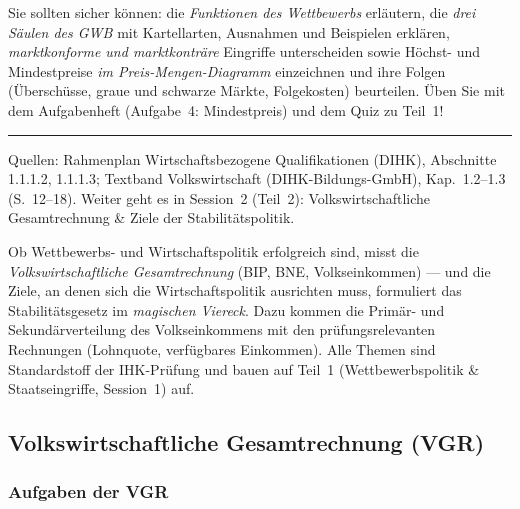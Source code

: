 \documentclass[11pt, a4paper]{article}
\begin{document}
\begin{merksatz}[title={\bfseries Wichtig für die Prüfungsvorbereitung (Teil 1)}]
Sie sollten sicher können: die \emph{Funktionen des Wettbewerbs} erläutern, die
\emph{drei Säulen des GWB} mit Kartellarten, Ausnahmen und Beispielen erklären,
\emph{marktkonforme und marktkonträre} Eingriffe unterscheiden sowie Höchst- und
Mindestpreise \emph{im Preis-Mengen-Diagramm} einzeichnen und ihre Folgen
(Überschüsse, graue und schwarze Märkte, Folgekosten) beurteilen. Üben Sie mit dem
Aufgabenheft (Aufgabe~4: Mindestpreis) und dem Quiz zu Teil~1!
\end{merksatz}

\vspace{1em}
\hrule
\vspace{0.8em}
\noindent\textsf{\small Quellen: Rahmenplan Wirtschaftsbezogene Qualifikationen (DIHK), Abschnitte 1.1.1.2, 1.1.1.3;
Textband Volkswirtschaft (DIHK-Bildungs-GmbH), Kap.~1.2--1.3 (S.~12--18).
Weiter geht es in Session~2 (Teil~2): Volkswirtschaftliche Gesamtrechnung \& Ziele der Stabilitätspolitik.}
\par{}\smallskip
\begin{merksatz}[title={\bfseries Worum geht es in Teil 2?}]
Ob Wettbewerbs- und Wirtschaftspolitik erfolgreich sind, misst die
\emph{Volkswirtschaftliche Gesamtrechnung} (BIP, BNE, Volkseinkommen) --- und die Ziele,
an denen sich die Wirtschaftspolitik ausrichten muss, formuliert das Stabilitätsgesetz
im \emph{magischen Viereck}. Dazu kommen die Primär- und Sekundärverteilung des
Volkseinkommens mit den prüfungsrelevanten Rechnungen (Lohnquote, verfügbares
Einkommen). Alle Themen sind Standardstoff der IHK-Prüfung und bauen auf Teil~1
(Wettbewerbspolitik \& Staatseingriffe, Session~1) auf.
\end{merksatz}



\subsection{Volkswirtschaftliche Gesamtrechnung (VGR)}

\subsubsection{Aufgaben der VGR}
\end{document}
